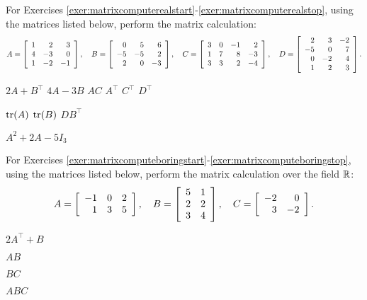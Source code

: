 \noindent For Exercises \ref{exer:matrixcomputerealstart}-\ref{exer:matrixcomputerealstop}, using the matrices listed below, perform the matrix calculation:
\[A = \mtx{rrr}{1&2&3\\4&-3&0\\1&-2&-1},\quad B = \mtx{rrr}{0&5&6\\-5&-5&2\\2&0&-3}, \quad C = \mtx{rrrr}{3&0&-1&2\\1&7&8&-3\\3&3&2&-4},\quad D=\mtx{rrr}{2&3&-2\\-5&0&7\\0&-2&4\\1&2&3}.\]
\begin{enumerate}[!HW!, label=$\spadesuit$ \arabic*., ref=\arabic*]
\begin{multicols}{6}
\item\label{exer:matrixcomputerealstart} $2A+B^\top$\columnbreak %
\itemspade $4A-3B$ \columnbreak
\itemspade $AC$ \columnbreak
\itemspade $A^\top$ \columnbreak
\itemspade $C^\top$ \columnbreak
\itemspade $D^\top$
\end{multicols}
\begin{multicols}{4}
\itemspade $\tr(A)$
\itemspade $\tr(B)$
\itemspade $DB^\top $
\item\label{exer:matrixcomputerealstop} $A^2 + 2A-5I_3$
\end{multicols}
\end{enumerate}

\noindent For Exercises  \ref{exer:matrixcomputeboringstart}-\ref{exer:matrixcomputeboringstop}, using the matrices listed below, perform the matrix calculation over the field $\R$:
\[A = \mtx{rrr}{-1&0&2\\1&3&5},\quad B = \mtx{rrr}{5&1\\2&2\\3&4}, \quad C = \mtx{rrrr}{-2&0\\3&-2}.\]
\begin{enumerate}[!HW!]
\begin{multicols}{4}
\item\label{exer:matrixcomputeboringstart} $2A^\top+B$ 
\item$AB$ 
\item $BC$ 
\item\label{exer:matrixcomputeboringstop} $ABC$ 
\end{multicols}
\end{enumerate}

